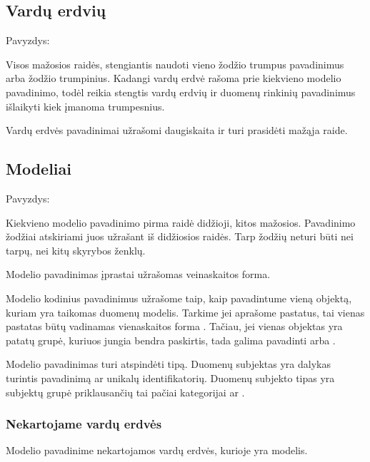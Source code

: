 \documentclass[letterpaper,10pt,lithuanian]{sphinxmanual}
\begin{document}
\subsection{Vardų erdvių}
\label{\detokenize{pavadinimai:vardu-erdviu}}
\sphinxAtStartPar
Pavyzdys: 

\sphinxAtStartPar
Visos mažosios raidės, stengiantis naudoti vieno žodžio trumpus
pavadinimus arba žodžio trumpinius. Kadangi vardų erdvė rašoma prie
kiekvieno modelio pavadinimo, todėl reikia stengtis vardų erdvių ir
duomenų rinkinių pavadinimus išlaikyti kiek įmanoma trumpesnius.

\sphinxAtStartPar
Vardų erdvės pavadinimai užrašomi daugiskaita ir turi prasidėti mažąja raide.


\subsection{Modeliai}
\label{\detokenize{pavadinimai:modeliai}}
\sphinxAtStartPar
Pavyzdys: 

\sphinxAtStartPar
Kiekvieno modelio pavadinimo pirma raidė didžioji, kitos mažosios.
Pavadinimo žodžiai atskiriami juos užrašant iš didžiosios raidės. Tarp
žodžių neturi būti nei tarpų, nei kitų skyrybos ženklų.

\sphinxAtStartPar
Modelio pavadinimas įprastai užrašomas veinaskaitos forma.

\sphinxAtStartPar
Modelio kodinius pavadinimus užrašome taip, kaip pavadintume vieną objektą,
kuriam yra taikomas duomenų modelis. Tarkime jei aprašome pastatus, tai vienas
pastatas būtų vadinamas vienaskaitos forma . Tačiau, jei vienas
objektas yra patatų grupė, kuriuos jungia bendra paskirtis, tada galima
pavadinti  arba .

\sphinxAtStartPar
Modelio pavadinimas turi atspindėti  tipą.
Duomenų subjektas yra dalykas turintis pavadinimą ar unikalų identifikatorių.
Duomenų subjekto tipas yra subjektų grupė priklausančių tai pačiai kategorijai
ar .


\subsubsection{Nekartojame vardų erdvės}
\label{\detokenize{pavadinimai:nekartojame-vardu-erdves}}
\sphinxAtStartPar
Modelio pavadinime nekartojamos vardų erdvės, kurioje yra modelis.
\end{document}
